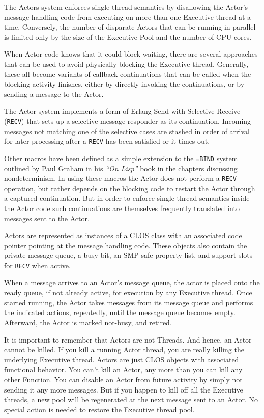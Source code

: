 \documentclass[article,oneside]{memoir}
\begin{document}
The Actors system enforces single thread semantics by disallowing the Actor's message handling code from executing on more than one Executive thread at a time. Conversely, the number of disparate Actors that can be running in parallel is limited only by the size of the Executive Pool and the number of CPU cores.

When Actor code knows that it could block waiting, there are several approaches that can be used to avoid physically blocking the Executive thread. Generally, these all become variants of callback continuations that can be called when the blocking activity finishes, either by directly invoking the continuations, or by sending a message to the Actor. 

The Actor system implements a form of Erlang Send with Selective Receive (\texttt{RECV}) that sets up a selective message responder as its continuation. Incoming messages not matching one of the selective cases are stashed in order of arrival for later processing after a \texttt{RECV} has been satisfied or it times out.

Other macros have been defined as a simple extension to the \texttt{=BIND} system outlined by Paul Graham in his \textit{``On Lisp''} book in the chapters discussing nondeterminism. In using these macros the Actor does not perform a \texttt{RECV} operation, but rather depends on the blocking code to restart the Actor through a captured continuation. But in order to enforce single-thread semantics inside the Actor code such continuations are themselves frequently translated into messages sent to the Actor.

Actors are represented as instances of a CLOS class with an associated code pointer pointing at the message handling code. These objects also contain the private message queue, a busy bit, an SMP-safe property list, and support slots for \texttt{RECV} when active.

When a message arrives to an Actor's message queue, the actor is placed onto the ready queue, if not already active, for execution by any Executive thread. Once started running, the Actor takes messages from its message queue and performs the indicated actions, repeatedly, until the message queue becomes empty. Afterward, the Actor is marked not-busy, and retired. 

It is important to remember that Actors are not Threads. And hence, an Actor cannot be killed. If you kill a running Actor thread, you are really killing the underlying Executive thread. Actors are just CLOS objects with associated functional behavior. You can't kill an Actor, any more than you can kill any other Function. You can disable an Actor from future activity by simply not sending it any more messages. But if you happen to kill off all the Executive threads, a new pool will be regenerated at the next message sent to an Actor. No special action is needed to restore the Executive thread pool.
\end{document}
